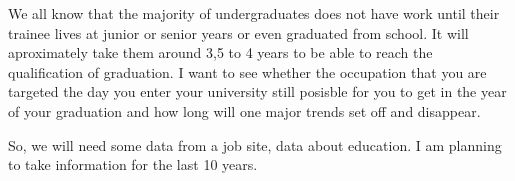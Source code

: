 \documentclass{article}
\begin{document}
We all know that the majority of undergraduates does not have work until their trainee lives at junior or senior years or even graduated from school. It will aproximately take them around 3,5 to 4 years to be able to reach the qualification of graduation. I want to see whether the occupation that you are targeted the day you enter your university still posisble for you to get in the year of your graduation and how long will one major trends set off and disappear.

So, we will need some data from a job site, data about education. I am planning to take information for the last 10 years.
\end{document}
